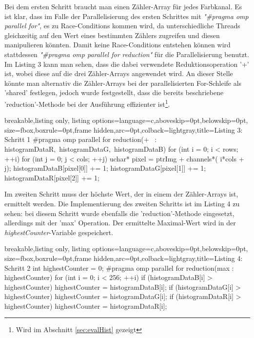 \documentclass[11pt]{amsart}
\begin{document}
Bei dem ersten Schritt braucht man einen Zähler-Array für jedes Farbkanal. Es ist klar, dass im Falle der Parallelisierung des ersten Schrittes mit \textit{"\#pragma omp parallel for"}, es zu Race-Conditions kommen wird, da unterschiedliche Threads gleichzeitig auf den Wert eines bestimmten Zählers zugreifen und diesen manipulieren könnten. Damit keine Race-Conditions entstehen können wird stattdessen \textit{"\#pragma omp parallel for reduction"} für die Parallelisierung benutzt. Im Listing 3 kann man sehen, dass die dabei verwendete Reduktionsoperation '+' ist, wobei diese auf die drei Zähler-Arrays angewendet wird. An dieser Stelle könnte man alternativ die Zähler-Arrays bei der parallelisierten For-Schleife als 'shared' festlegen, jedoch wurde festgestellt, dass die bereits beschriebene 'reduction'-Methode bei der Ausführung effizienter ist\footnote{Wird im Abschnitt \ref{sec:evalHist} gezeigt}.

  \begin{tcblisting}{breakable,listing only,
  listing options={language=c,aboveskip=0pt,belowskip=0pt},
  size=fbox,boxrule=0pt,frame hidden,arc=0pt,colback=lightgray,title=Listing 3: Schritt 1}
 #pragma omp parallel for reduction(+ \
                                    : histogramDataR,\ 
                                      histogramDataG,\ 
                                      histogramDataB)
         for (int i = 0; i < rows; ++i) {
             for (int j = 0; j < cols; ++j) {
                 uchar* pixel = ptrImg + channels*( i*cols + j);
                 histogramDataB[pixel[0]] += 1;
                 histogramDataG[pixel[1]] += 1;
                 histogramDataR[pixel[2]] += 1;
             }
         }
\end{tcblisting}

Im zweiten Schritt muss der höchste Wert, der in einem der Zähler-Arrays ist, ermittelt werden. Die Implementierung des zweiten Schritts ist im Listing 4 zu sehen: bei diesem Schritt wurde ebenfalls die 'reduction'-Methode eingesetzt, allerdings mit der 'max' Operation. Der ermittelte Maximal-Wert wird in der \textit{highestCounter}-Variable gespeichert.

  \begin{tcblisting}{breakable,listing only,
  listing options={language=c,aboveskip=0pt,belowskip=0pt},
  size=fbox,boxrule=0pt,frame hidden,arc=0pt,colback=lightgray,title=Listing 4: Schritt 2}
        int highestCounter = 0;
 #pragma omp parallel for reduction(max : highestCounter)
        for (int i = 0; i < 256; ++i) {
             if (histogramDataB[i] > highestCounter) {
                 highestCounter = histogramDataB[i];
             }
             if (histogramDataG[i] > highestCounter) {
                 highestCounter = histogramDataG[i];
             }
            if (histogramDataR[i] > highestCounter) {
                 highestCounter = histogramDataR[i];
             }
         }
   \end{tcblisting}     
   
\end{document}
